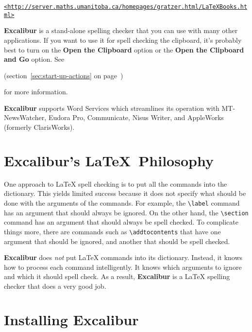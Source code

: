 \documentclass[11pt,titlepage]{article}
\newcommand{\ex}{\textbf{Excalibur}}
\begin{document}
\begin{latexonly}
\begin{alltt}
\url{<http://server.maths.umanitoba.ca/homepages/gratzer.html/LaTeXBooks.html>}
\end{alltt}
\end{latexonly}

\ex{} is a stand-alone spelling checker that you can use with many
other applications.  If you want to use it for spell checking the
clipboard, it's probably best to turn on the \textbf{Open the
  Clipboard} option or the \textbf{Open the Clipboard and Go} option.
See 
\begin{latexonly}
  (section~\ref{sec:start-up-actions} on
  page~\pageref{sec:start-up-actions})
\end{latexonly}
for more information.

\ex{} supports Word Services which streamlines its operation with
MT-NewsWatcher, Eudora Pro, Communicate, Nisus Writer, and
AppleWorks (formerly ClarisWorks).

\section{Excalibur's \LaTeX\ Philosophy}

One approach to \LaTeX{} spell checking is to put all the commands
into the dictionary. This yields limited success because it does not
specify what should be done with the arguments of the commands. For
example, the \verb+\label+ command has an argument that should always
be ignored. On the other hand, the \verb+\section+ command has an
argument that should always be spell checked. To complicate things
more, there are commands such as \verb+\addtocontents+ that have one
argument that should be ignored, and another that should be spell
checked.

\ex{} does \emph{not} put \LaTeX{} commands into its dictionary.
Instead, it knows how to process each command intelligently. It knows
which arguments to ignore and which it should spell check. As a
result, \ex{} is a \LaTeX{} spelling checker that does a very good
job.

\section{Installing Excalibur}
\end{document}
